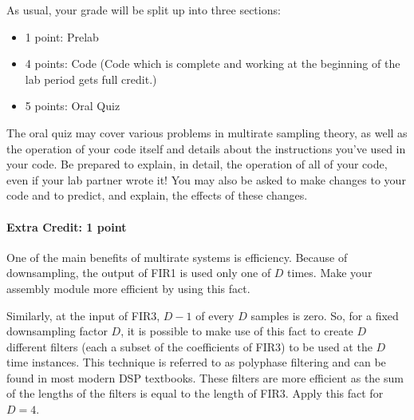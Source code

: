 As usual, your grade will be split up into three sections:
\begin{itemize}
\item 1 point: Prelab
\item 4 points: Code (Code which is complete and working at the 
        beginning of the lab period gets full credit.)
\item 5 points: Oral Quiz
\end{itemize}
The oral quiz may cover various problems in multirate sampling theory,
as well as the operation of your code itself and details about the
instructions you've used in your code. Be prepared to explain, in
detail, the operation of all of your code, even if your lab partner
wrote it!  You may also be asked to make changes to your code and
to predict, and explain, the effects of these changes.

\paragraph{Extra Credit: 1 point}
One of the main benefits of multirate systems is efficiency.  Because of 
downsampling, the output of FIR1 is used only one of $D$ times.  Make 
your assembly module more efficient by using this fact.  

Similarly, at the input of FIR3, $D-1$ of every $D$ samples is zero.  
So, for a fixed downsampling factor $D$, it is possible to make use of 
this fact to create $D$ different filters (each a subset of the 
coefficients of FIR3) to be used at the $D$ time instances.  This 
technique is referred to as polyphase filtering and can be found 
in most modern DSP textbooks.  These filters are more efficient as 
the sum of the lengths of the filters is equal to the length of FIR3.  
Apply this fact for $D=4$.
